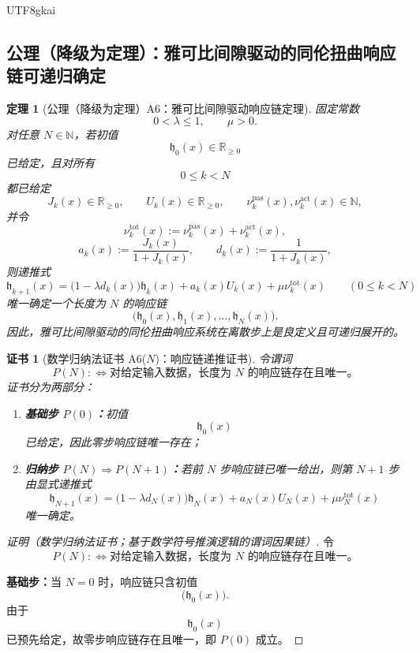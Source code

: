 \documentclass[12pt]{article}
\newtheorem{theorem}{定理}[section]
\newtheorem{Certificate}{证书}[section]
\newcommand{\NN}{\mathbb{N}}
\newcommand{\RR}{\mathbb{R}}
\begin{document}
\begin{CJK*}{UTF8}{gkai}
\subsection{公理（降级为定理）：雅可比间隙驱动的同伦扭曲响应链可递归确定}
\label{subsec:tex36-jac-gap-recursion}

\begin{theorem}[公理（降级为定理）A6：雅可比间隙驱动响应链定理]
\label{thm:tex36-a6}
固定常数
\[
  0<\lambda\le 1,
  \qquad
  \mu>0.
\]
对任意 $N\in\NN$，若初值
\[
  \mathfrak h_0(x)\in \RR_{\ge 0}
\]
已给定，且对所有
\[
  0\le k<N
\]
都已给定
\[
  J_k(x)\in \RR_{\ge 0},
  \qquad
  U_k(x)\in \RR_{\ge 0},
  \qquad
  \nu_k^{\mathrm{pas}}(x),\nu_k^{\mathrm{act}}(x)\in\NN,
\]
并令
\[
  \nu_k^{\mathrm{tot}}(x)
  :=
  \nu_k^{\mathrm{pas}}(x)+\nu_k^{\mathrm{act}}(x),
\]
\[
  a_k(x):=\frac{J_k(x)}{1+J_k(x)},
  \qquad
  d_k(x):=\frac{1}{1+J_k(x)},
\]
则递推式
\[
  \mathfrak h_{k+1}(x)
  =
  \bigl(1-\lambda d_k(x)\bigr)\mathfrak h_k(x)
  +
  a_k(x)U_k(x)
  +
  \mu \nu_k^{\mathrm{tot}}(x)
  \qquad (0\le k<N)
\]
唯一确定一个长度为 $N$ 的响应链
\[
  \bigl(\mathfrak h_0(x),\mathfrak h_1(x),\ldots,\mathfrak h_N(x)\bigr).
\]
因此，雅可比间隙驱动的同伦扭曲响应系统在离散步上是良定义且可递归展开的。
\end{theorem}

\begin{Certificate}[数学归纳法证书 A6($N$)：响应链递推证书]
\label{cert:tex36-a6}
令谓词
\[
  P(N)
  :
  \Longleftrightarrow
  \text{对给定输入数据，长度为 $N$ 的响应链存在且唯一。}
\]
证书分为两部分：
\begin{enumerate}
  \item \textbf{基础步 $P(0)$：}初值
  \[
    \mathfrak h_0(x)
  \]
  已给定，因此零步响应链唯一存在；
  \item \textbf{归纳步 $P(N)\Rightarrow P(N+1)$：}若前 $N$ 步响应链已唯一给出，则第 $N+1$ 步由显式递推式
  \[
    \mathfrak h_{N+1}(x)
    =
    \bigl(1-\lambda d_N(x)\bigr)\mathfrak h_N(x)
    +
    a_N(x)U_N(x)
    +
    \mu \nu_N^{\mathrm{tot}}(x)
  \]
  唯一确定。
\end{enumerate}
\end{Certificate}

\begin{proof}[证明（数学归纳法证书；基于数学符号推演逻辑的谓词因果链）]
令
\[
  P(N)
  :
  \Longleftrightarrow
  \text{对给定输入数据，长度为 $N$ 的响应链存在且唯一。}
\]

\textbf{基础步：}当 $N=0$ 时，响应链只含初值
\[
  \bigl(\mathfrak h_0(x)\bigr).
\]
由于
\[
  \mathfrak h_0(x)
\]
已预先给定，故零步响应链存在且唯一，即 $P(0)$ 成立。


\end{proof}
\end{CJK*}
\end{document}
